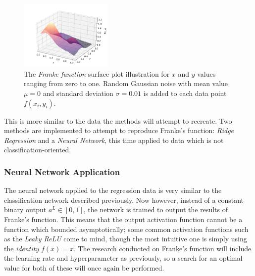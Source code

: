        \begin{figure}[H]
        	\centering
        	\includegraphics[width = 0.4\textwidth]{figures/Franke_noise.png}
        	\caption{The \textit{Franke function} surface plot illustration for $x$ and $y$ values ranging from zero to one. Random Gaussian noise with mean value $\mu=0$ and standard deviation $\sigma=0.01$ is added to each data point $f(x_i,y_i)$.}
        	\label{fig:frankesfunction}
        \end{figure}
        This is more similar to the data the methods will attempt to recreate. Two methods are implemented to attempt to reproduce Franke's function: \textit{Ridge Regression} %
        and a \textit{Neural Network}, this time applied to data which is not classification-oriented.
        \subsubsection{Neural Network Application}
            The neural network applied to the regression data is very similar to the classification network described previously. %
            Now however, instead of a constant binary output $a^L\in[0,1]$, the network is trained to output the results of Franke's function. This means that the output activation function cannot be a function which bounded asymptotically; some common activation functions such as the \textit{Leaky ReLU} come to mind, though the most intuitive one is simply using the \textit{identity} $f(x)=x$. The research conducted on Franke's function will include the learning rate and hyperparameter as previously, so a search for an optimal value for both of these will once again be performed.

